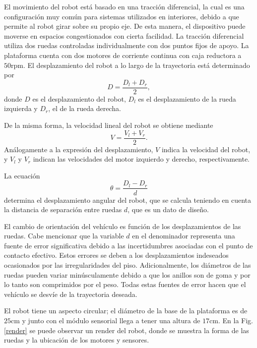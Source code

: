 \documentclass[conference,a4paper,9pt]{IEEEtran}
\begin{document}
El movimiento del robot está basado en una tracción diferencial, la cual es una configuración muy común para sistemas utilizados en interiores, debido a que permite al robot girar sobre su propio eje. De esta manera, el dispositivo puede moverse en espacios congestionados con cierta facilidad. La tracción diferencial utiliza dos ruedas controladas individualmente con dos puntos fijos de apoyo. La plataforma cuenta con dos motores de corriente continua con caja reductora a $50\mathrm{rpm}$. El desplazamiento del robot a lo largo de la trayectoria está determinado por
\begin{equation}
D = \frac{D_l + D_r}{2},
\label{eq:desplazamiento}
\end{equation}
donde $D$ es el desplazamiento del robot, $D_l$ es el desplazamiento de la rueda izquierda y $D_r$, el de la rueda derecha.

De la misma forma, la velocidad lineal del robot se obtiene mediante
\begin{equation}
V = \frac{V_l + V_r}{2}.
\label{eq:velocidad}
\end{equation}
Análogamente a la expresión del desplazamiento, $V$ indica la velocidad del robot, y $V_l$ y $V_r$ indican las velocidades del motor izquierdo y derecho, respectivamente.

La ecuación
\begin{equation}
\theta = \frac{D_l - D_r}{d}
\label{eq:desplazamiento_angular}
\end{equation}
determina el desplazamiento angular del robot, que se calcula teniendo en cuenta la distancia de separación entre ruedas $d$, que es un dato de diseño.

El cambio de orientación del vehículo es función de los desplazamientos de las ruedas. Cabe mencionar que la variable $d$ en el denominador representa una fuente de error significativa debido a las incertidumbres asociadas con el punto de contacto efectivo. Estos errores se deben a los desplazamientos indeseados ocasionados por las irregularidades del piso. Adicionalmente, los diámetros de las ruedas pueden variar minúsculamente debido a que los anillos son de goma y por lo tanto son comprimidos por el peso. Todas estas fuentes de error hacen que el vehículo se desvíe de la trayectoria deseada.

El robot tiene un aspecto circular; el diámetro de la base de la plataforma es de $25\mathrm{cm}$ y junto con el módulo sensorial llega a tener una altura de $17\mathrm{cm}$. En la Fig. \ref{render} se puede observar un render del robot, donde se muestra la forma de las ruedas y la ubicación de los motores y sensores.
\end{document}
